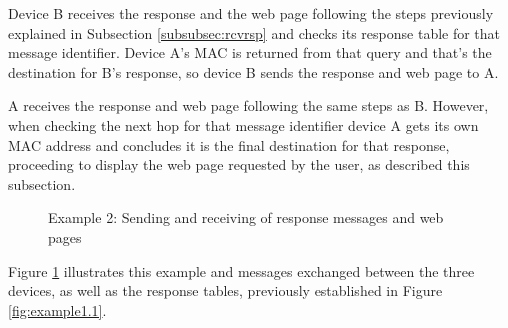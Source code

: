 Device B receives the response and the web page following the steps previously explained in Subsection \ref{subsubsec:rcvrsp} and checks its response table for that message identifier. Device A's \gls{MAC} is returned from that query and that's the destination for B's response, so device B sends the response and web page to A.

A receives the response and web page following the same steps as B. However, when checking the next hop for that message identifier device A gets its own \gls{MAC} address and concludes it is the final destination for that response, proceeding to display the web page requested by the user, as described this subsection.

\begin{figure}[ht]
   \noindent{}
	\caption{\label{fig:example1.2} Example 2: Sending and receiving of response messages and web pages}
\end{figure}

Figure \ref{fig:example1.2} illustrates this example and messages exchanged between the three devices, as well as the response tables, previously established in Figure \ref{fig:example1.1}.











